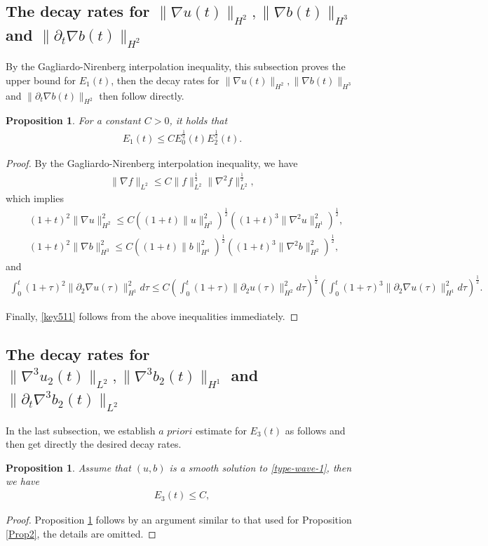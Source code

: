 \documentclass[reqno,11pt]{amsart}
\newtheorem{Prop}[Thm]{Proposition}
\numberwithin{Thm}{section}
\begin{document}
\subsection{The decay rates for $\|\nabla u(t)\|_{H^{2}},\|\nabla b(t)\|_{H^{3}}$ and $
		\|\partial_t\nabla b(t)\|_{H^{2}}$}

By the Gagliardo-Nirenberg interpolation inequality, this subsection proves the upper bound for $E_1(t)$, then the decay rates for $\|\nabla u(t)\|_{H^{2}},\|\nabla b(t)\|_{H^{3}}$ and $\|\partial_t\nabla b(t)\|_{H^{2}}$ then follow directly.
\begin{Prop}\label{key51}
For a constant $C>0$, it holds that
\begin{align}\label{key511}
		E_1(t)
		\leq  CE_0^{\frac{1}{2}}(t)E_2^{\frac{1}{2}}(t).
\end{align}
\end{Prop}

\begin{proof}
By the Gagliardo-Nirenberg interpolation inequality, we have
\begin{align*}
\|\nabla f\|_{L^2}\leq C\| f\|_{L^2}^{\frac{1}{2}}\|\nabla^{2}f\|_{L^2}^{\frac{1}{2}},
\end{align*}
which implies
\begin{align*}
&(1+t)^2\|\nabla u\|_{H^2}^2\leq C\left((1+t)\| u\|_{H^3}^2\right)^{\frac{1}{2}}\left((1+t)^3\|\nabla^{2}u\|_{H^1}^2\right)^{\frac{1}{2}},\nonumber\\
&(1+t)^2\|\nabla b\|_{H^3}^2\leq C\left((1+t)\| b\|_{H^4}^2\right)^{\frac{1}{2}}\left((1+t)^3\|\nabla^{2}b\|_{H^2}^2\right)^{\frac{1}{2}},
\end{align*}
and
\begin{align*}
\int_0^t(1+\tau)^2\|\partial_2\nabla u(\tau)\|_{H^1}^2d\tau
\leq C\left(\int_0^t(1+\tau)\|\partial_2 u(\tau)\|_{H^2}^2d\tau\right)^{\frac{1}{2}}\left(\int_0^t(1+\tau)^3\|\partial_2\nabla u(\tau)\|_{H^1}^2d\tau\right)^{\frac{1}{2}}.
\end{align*}

Finally, \eqref{key511} follows from the above inequalities immediately.
\end{proof}


\subsection{The decay rates for $\|\nabla^3 u_2(t)\|_{L^{2}},\|\nabla^3 b_2(t)\|_{H^{1}}$ and $
		\|\partial_t\nabla^3 b_2(t)\|_{L^{2}}$}
\medskip
In the last subsection, we establish $a$ $priori$ estimate for $E_3(t)$ as follows and then get directly the desired decay rates.
\begin{Prop}\label{key5.1}
Assume that $(u,b)$ is a smooth solution to \eqref{type-wave-1}, then we have
\begin{align*}
	E_3(t)\leq C,
\end{align*}
\end{Prop}
\begin{proof}
Proposition \ref{key5.1} follows by an argument similar to that used for Proposition  \ref{Prop2}, the details are omitted.
\end{proof}
\end{document}
